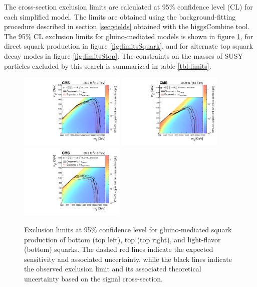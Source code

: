 The cross-section exclusion limits are calculated at 95\% confidence level (CL) for each simplified model. The limits are obtained using the background-fitting procedure described in section \ref{sec:yields} obtained with the higgsCombine tool. The 95\% CL exclusion limits for gluino-mediated models is shown in figure \ref{fig:limitsGluino}, for direct squark production in figure \ref{fig:limitsSquark}, and for alternate top squark decay modes in figure \ref{fig:limitsStop}. The constraints on the masses of SUSY particles excluded by this search is summarized in table \ref{tbl:limits}.
\begin{figure}
	\centering
	\includegraphics[width=0.45\textwidth]{results/figs/interpretations/T1bbbb_35p9ifb_Moriond2017_Mar07_XSEC}
	\includegraphics[width=0.45\textwidth]{results/figs/interpretations/T1tttt_35p9ifb_Moriond2017_Mar07_XSEC}
	\includegraphics[width=0.45\textwidth]{results/figs/interpretations/T1qqqq_35p9ifb_Moriond2017_Mar07_XSEC}
	\caption{Exclusion limits at 95\% confidence level for gluino-mediated squark production of bottom (top left), top (top right), and light-flavor (bottom) squarks. The dashed red lines indicate the expected sensitivity and associated uncertainty, while the black lines indicate the observed exclusion limit and its associated theoretical uncertainty based on the signal cross-section.}
	\label{fig:limitsGluino}
\end{figure}

